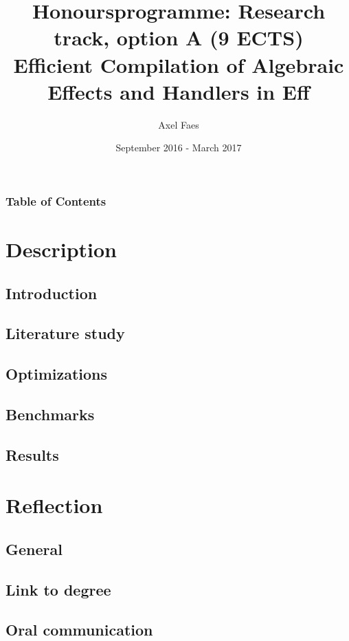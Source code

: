 \documentclass{beamer}
\title[Honoursprogramme: Research track]{
Honoursprogramme: Research track, option A (9 ECTS) \\
\large Efficient Compilation of Algebraic Effects and Handlers in Eff} %
\author[Axel Faes]{
Axel Faes
}
\institute[KUL] %
{
prof. dr. ir. Tom Schrijvers\\
Amr Hany Shehata Saleh\\\mbox{}\\
Master in de ingenieurswetenschappen: computerwetenschappen (fase 1) \\
Specialisatie: Artificiel Intelligence \\
\medskip
KULeuven %
}
\date{September 2016 - March 2017} %
\begin{document}
\begin{frame}
\titlepage %
\end{frame}

\begin{frame}{\contentsname}
\frametitle{Table of Contents} %
\tableofcontents
\end{frame}


\section{Description}
\subsection{Introduction}
\subsection{Literature study}
\subsection{Optimizations}
\subsection{Benchmarks}
\subsection{Results}

\section{Reflection}
\subsection{General}
\subsection{Link to degree}
\subsection{Oral communication}
\end{document}
